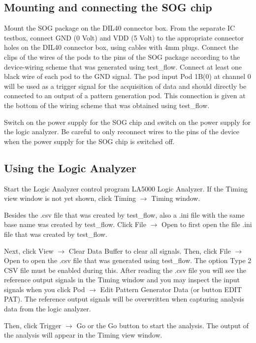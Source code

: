 \subsection{Mounting and connecting the SOG chip}
Mount the SOG package on the DIL40 connector box.  From the separate IC testbox,
connect GND (0 Volt) and VDD (5 Volt) to the appropriate connector holes on the 
DIL40 connector box, using cables with 4mm plugs.
Connect the clips of the wires of the pods to the pins of the SOG package according to 
the device-wiring scheme that was generated using test\_flow. Connect at least one black 
wire of each pod to the GND signal.  The pod input Pod 1B(0) at channel 0 will be used 
as a trigger signal for the acquisition of data and should directly be connected to an 
output of a pattern generation pod. 
This connection is given at the bottom of the wiring 
scheme that was obtained using test\_flow.

Switch on the power supply for the SOG chip and switch on the power supply for the 
logic analyzer.  
Be careful to only reconnect wires to the pins of the device when the 
power supply for the SOG chip is switched off. 

\subsection{Using the Logic Analyzer}
Start the Logic Analyzer control program LA5000 Logic Analyzer.
If the Timing view window is not yet shown, click Timing $\rightarrow$ Timing window.

Besides the .csv file that was created by test\_flow, also a .ini file
with the same base name was created by test\_flow.
Click File $\rightarrow$ Open to first open the file .ini file that was created by test\_flow.

Next, click View $\rightarrow$ Clear Data Buffer to clear all signals.
Then, click File $\rightarrow$ Open to open the .csv file that was generated using test\_flow.
The option Type 2 CSV file must be enabled during this.
After reading the .csv file you will see the reference output signals in the Timing window
and you may inspect the input signals when you click Pod $\rightarrow$ Edit Pattern
Generator Data (or button EDIT PAT).
The reference output signals will be overwritten when capturing analysis
data from the logic analyzer.

Then, click Trigger $\rightarrow$ Go or the Go button to start the analysis. 
The output of the analysis will appear in the Timing view window. 

